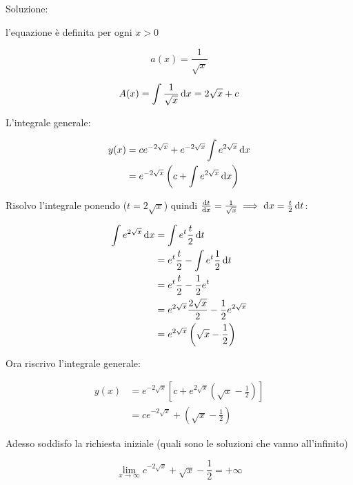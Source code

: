 Soluzione:

l'equazione è definita per ogni \(x>0\)

\[
    a(x) = \frac{1}{\sqrt{x}}
\]

\[
    A(x) = \int \frac{1}{\sqrt{x}} \mathop{}\!\mathrm{d} x = 2\sqrt{x} + c
\]


L'integrale generale:

\begin{align*}
    y(x) & = ce^{-2\sqrt{x}} + e^{-2\sqrt{x}} \int e^{2\sqrt{x}} \mathop{}\!\mathrm{d} x  \\
         & = e^{-2\sqrt{x}} \left( c + \int e^{2\sqrt{x}} \mathop{}\!\mathrm{d} x \right)
\end{align*}

Risolvo l'integrale ponendo (\(t = 2\sqrt{x}\)) quindi \( \frac{\mathop{}\!\mathrm{d} t}{\mathop{}\!\mathrm{d} x} = \frac{1}{\sqrt{x}} \implies \mathop{}\!\mathrm{d} x = \frac{t}{2} \mathop{}\!\mathrm{d} t \):

\begin{spreadlines}{3mm}
    \begin{align*}
        \int e^{2 \sqrt{x}} \mathop{}\!\mathrm{d} x & = \int e^{t}\frac{t}{2} \mathop{}\!\mathrm{d} t                                 \\
                                    & = e^{t}\frac{t}{2} - \int e^{t}\frac{1}{2} \mathop{}\!\mathrm{d} t              \\
                                    & = e^{t} \frac{t}{2} - \frac{1}{2} e^{t}                         \\
                                    & = e^{2\sqrt{x}} \frac{2\sqrt{x}}{2} - \frac{1}{2} e^{2\sqrt{x}} \\
                                    & = e^{2\sqrt{x}} \left( \sqrt{x} - \frac{1}{2} \right)
    \end{align*}
\end{spreadlines}

\filbreak{}

Ora riscrivo l'integrale generale:

\begin{align*}
    y(x) & = e^{-2 \sqrt{x}} \left[ c + e^{2 \sqrt{x}} \left( \sqrt{x}- \frac{1}{2} \right) \right] \\
         & = c e^{-2 \sqrt{x}} + \left( \sqrt{x} - \frac{1}{2} \right)
\end{align*}

\filbreak{}

Adesso soddisfo la richiesta iniziale (quali sono le soluzioni che vanno all'infinito)

\[
    \lim_{x \to \infty} c ^{-2 \sqrt{x}} + \sqrt{x} - \frac{1}{2} = +\infty
\]

